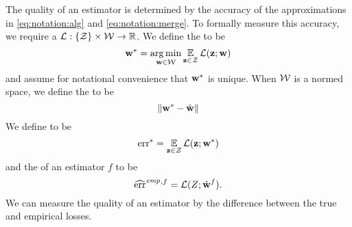 \documentclass[thesis.tex]{subfiles}
\newcommand{\riskstar}{{\textrm{err}^*}}
\newcommand{\riskemp}{\widehat{\textrm{err}}^\textit{emp}}
\begin{document}
The quality of an estimator is determined by the accuracy of the approximations in \eqref{eq:notation:alg} and \eqref{eq:notation:merge}.
To formally measure this accuracy, 
we require a  $\mathcal{L} : \{{\mathcal Z}\} \times {\mathcal W} \to \mathbb R$. 
We define the  to be 
\begin{equation}
    {\mathbf w^{*}} = \operatorname*{arg\,min}_{\mathbf w\in{\mathcal W}} \operatorname*{\mathbb E}_{\mathbf z\in{\mathcal Z}}\mathcal{L}(\mathbf z;\mathbf w)
\end{equation}
and assume for notational convenience that ${\mathbf w^{*}}$ is unique.
When ${\mathcal W}$ is a normed space, we define the  to be
\begin{equation}
    {\lVert {{\mathbf w^{*}}-{\hat{\mathbf w}}} \rVert}
\end{equation}
We define  to be
\begin{equation}
    \riskstar = \E_{\z\in\Z}\Loss(\z;\wstar)
\end{equation}
and the  of an estimator $f$ to be 
\begin{equation}
    \riskemp{}^{,f} = \Loss(Z;\what^f)
    .
\end{equation}
We can measure the quality of an estimator by the difference between the true and empirical losses.
\end{document}

